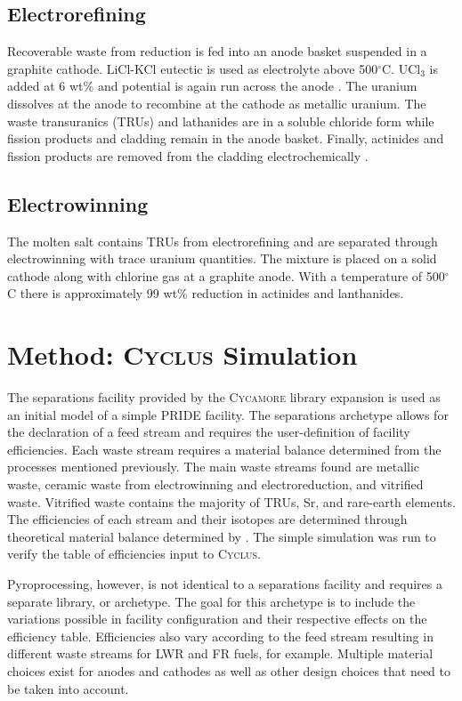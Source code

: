 \documentclass{anstrans}
\newcommand{\Cyclus}{\textsc{Cyclus}\xspace}%
\newcommand{\Cycamore}{\textsc{Cycamore}\xspace}%
\begin{document}
\subsection{Electrorefining}

Recoverable waste from reduction is fed into an anode basket suspended in a graphite cathode. LiCl-KCl eutectic is used as electrolyte above 500$^{\circ}$C. UCl$_3$ is added at 6 wt\% and potential is again run across the anode \cite{flowsheet_1998,lee_korean_2011}. The uranium dissolves at the anode to recombine at the cathode as metallic uranium. The waste transuranics (TRUs) and lathanides are in a soluble chloride form  while fission products and cladding remain in the anode basket. Finally, actinides and fission products are removed from the cladding electrochemically \cite{lee_korean_2011}.

\subsection{Electrowinning}

The molten salt contains TRUs from electrorefining and are separated through electrowinning with trace uranium quantities. The mixture is placed on a solid cathode along with chlorine gas at a graphite anode. With a temperature of 500$^{\circ}$C there is approximately 99 wt\% reduction in actinides and lanthanides. 
\section{Method: \Cyclus Simulation}
The separations facility provided by the \Cycamore library expansion is used as an initial model of a simple PRIDE facility. The separations archetype allows for the declaration of a feed stream and requires the user-definition of facility efficiencies. Each waste stream requires a material balance determined from the processes mentioned previously. The main waste streams found are metallic waste, ceramic waste from electrowinning and electroreduction, and vitrified waste. Vitrified waste contains the majority of TRUs, Sr, and rare-earth elements. The efficiencies of each stream and their isotopes are determined through theoretical material balance determined by \cite{flowsheet_1998}. The simple simulation was run to verify the table of efficiencies input to \Cyclus.

Pyroprocessing, however, is not identical to a separations facility and requires a separate library, or archetype. The goal for this archetype is to include the variations possible in facility configuration and their respective effects on the efficiency table. Efficiencies also vary according to the feed stream resulting in different waste streams for LWR and FR fuels, for example. Multiple material choices exist for anodes and cathodes as well as other design choices that need to be taken into account. 
\end{document}
